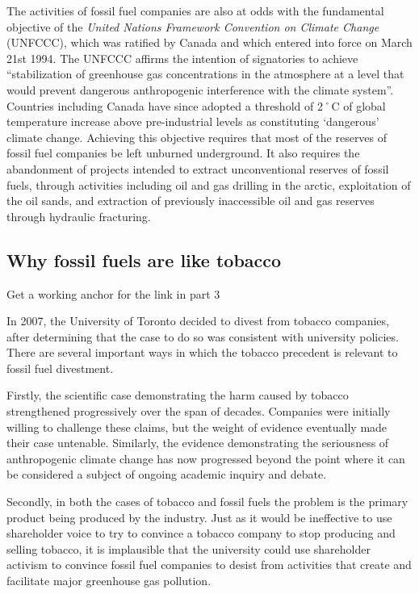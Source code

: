 The activities of fossil fuel companies are also at odds with the fundamental objective of the \emph{United Nations Framework Convention on Climate Change} (UNFCCC), which was ratified by Canada and which entered into force on March 21st 1994.
The UNFCCC affirms the intention of signatories to achieve ``stabilization of greenhouse gas concentrations in the atmosphere at a level that would prevent dangerous anthropogenic interference with the climate system''.
Countries including Canada have since adopted a threshold of 2˚C of global temperature increase above pre-industrial levels as constituting `dangerous' climate change.
Achieving this objective requires that most of the reserves of fossil fuel companies be left unburned underground.
It also requires the abandonment of projects intended to extract unconventional reserves of fossil fuels, through activities including oil and gas drilling in the arctic, exploitation of the oil sands, and extraction of previously inaccessible oil and gas reserves through hydraulic fracturing.



	\subsection{Why fossil fuels are like tobacco}


\begin{vcom}
		Get a working anchor for the link in part 3
\end{vcom}




In 2007, the University of Toronto decided to divest from tobacco companies, after determining that the case to do so was consistent with university policies.
There are several important ways in which the tobacco precedent is relevant to fossil fuel divestment.



Firstly, the scientific case demonstrating the harm caused by tobacco strengthened progressively over the span of decades.
Companies were initially willing to challenge these claims, but the weight of evidence eventually made their case untenable.
Similarly, the evidence demonstrating the seriousness of anthropogenic climate change has now progressed beyond the point where it can be considered a subject of ongoing academic inquiry and debate.


Secondly, in both the cases of tobacco and fossil fuels the problem is the primary product being produced by the industry.
Just as it would be ineffective to use shareholder voice to try to convince a tobacco company to stop producing and selling tobacco, it is implausible that the university could use shareholder activism to convince fossil fuel companies to desist from activities that create and facilitate major greenhouse gas pollution.



